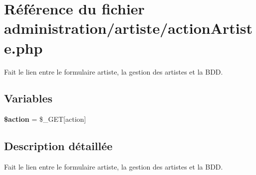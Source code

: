 \hypertarget{actionArtiste_8php}{}\section{Référence du fichier administration/artiste/action\+Artiste.php}
\label{actionArtiste_8php}


Fait le lien entre le formulaire artiste, la gestion des artistes et la B\+DD.  


\subsection*{Variables}
\begin{DoxyCompactItemize}
\item 
\mbox{\label{actionArtiste_8php_aa698a3e72116e8e778be0e95d908ee30}} 
{\bfseries \$action} = \$\+\_\+\+G\+ET\mbox{[}\textquotesingle{}action\textquotesingle{}\mbox{]}
\end{DoxyCompactItemize}


\subsection{Description détaillée}
Fait le lien entre le formulaire artiste, la gestion des artistes et la B\+DD. 

